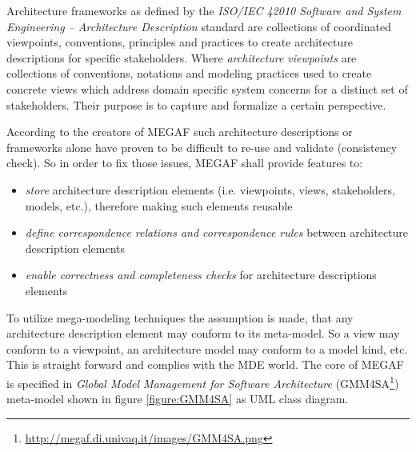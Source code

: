 

Architecture frameworks as defined by the \textit{ISO/IEC 42010 Software and System Engineering – Architecture Description} \cite{ISO/IEC42010} standard are collections of coordinated viewpoints, conventions, principles and practices to create architecture descriptions for specific stakeholders. Where \textit{architecture viewpoints} are collections of conventions, notations and modeling practices used to create concrete views which address domain specific system concerns for a distinct set of stakeholders. Their purpose is to capture and formalize a certain perspective.

According to the creators of MEGAF such architecture descriptions or frameworks alone have proven to be difficult to re-use and validate (consistency check). So in order to fix those issues, MEGAF shall provide features to: 
\begin{itemize}

\item 
\textit{store} architecture description elements (i.e. viewpoints, views, stakeholders, models, etc.), therefore making such elements reusable

\item
\textit{define correspondence relations and correspondence rules} between architecture description elements

\item
\textit{enable correctness and completeness checks} for architecture descriptions elements

\end{itemize}

To utilize mega-modeling techniques the assumption is made, that any architecture description element may conform to its meta-model. So a view may conform to a viewpoint, an architecture model may conform to a model kind, etc. This is straight forward and complies with the MDE world. The core of MEGAF is specified in \textit{Global Model Management for Software Architecture} (GMM4SA\footnote{\url{http://megaf.di.univaq.it/images/GMM4SA.png}}) meta-model shown in figure \ref{figure:GMM4SA} as UML class diagram. 


